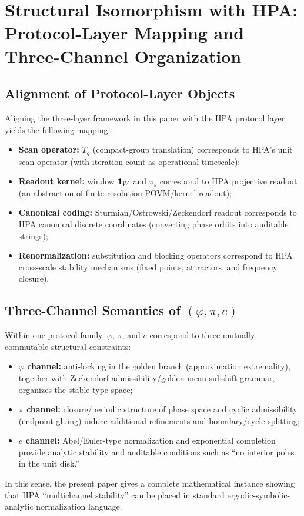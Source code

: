 ﻿\section{Structural Isomorphism with HPA: Protocol-Layer Mapping and Three-Channel Organization}

\subsection{Alignment of Protocol-Layer Objects}

Aligning the three-layer framework in this paper with the HPA protocol layer yields the following mapping:
\begin{itemize}
  \item \textbf{Scan operator:} $T_g$ (compact-group translation) corresponds to HPA's unit scan operator (with iteration count as operational timescale);
  \item \textbf{Readout kernel:} window $\mathbf{1}_W$ and $\pi_\varepsilon$ correspond to HPA projective readout (an abstraction of finite-resolution POVM/kernel readout);
  \item \textbf{Canonical coding:} Sturmian/Ostrowski/Zeckendorf readout corresponds to HPA canonical discrete coordinates (converting phase orbits into auditable strings);
  \item \textbf{Renormalization:} substitution and blocking operators correspond to HPA cross-scale stability mechanisms (fixed points, attractors, and frequency closure).
\end{itemize}

\subsection{Three-Channel Semantics of \texorpdfstring{$(\varphi,\pi,e)$}{(varphi, pi, e)}}

Within one protocol family, $\varphi$, $\pi$, and $e$ correspond to three mutually commutable structural constraints:
\begin{itemize}
  \item \textbf{$\varphi$ channel:} anti-locking in the golden branch (approximation extremality), together with Zeckendorf admissibility/golden-mean subshift grammar, organizes the stable type space;
  \item \textbf{$\pi$ channel:} closure/periodic structure of phase space and cyclic admissibility (endpoint gluing) induce additional refinements and boundary/cycle splitting;
  \item \textbf{$e$ channel:} Abel/Euler-type normalization and exponential completion provide analytic stability and auditable conditions such as ``no interior poles in the unit disk.''
\end{itemize}

In this sense, the present paper gives a complete mathematical instance showing that HPA ``multichannel stability'' can be placed in standard ergodic-symbolic-analytic normalization language.
